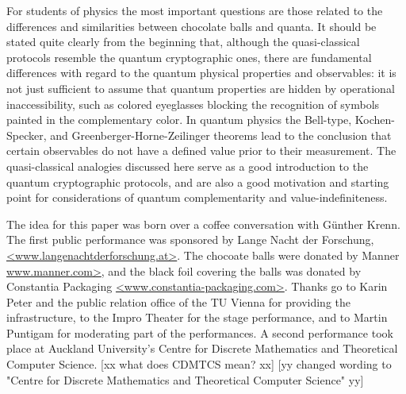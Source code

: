 \documentclass[prb,amssymb,preprint]{revtex4}
\begin{document}
For students of physics the most important questions
are those related to the differences and similarities between chocolate balls
and quanta.
It should be stated quite clearly from the beginning that,
although the quasi-classical protocols resemble the quantum cryptographic
ones, there are fundamental differences
with regard to the quantum physical properties and observables:
it is not just sufficient to assume that quantum properties are hidden
by operational inaccessibility, such as colored eyeglasses
blocking the recognition of symbols painted in the complementary color.
In quantum physics the Bell-type, Kochen-Specker,
and Greenberger-Horne-Zeilinger theorems\cite{mermin-93}
lead to the conclusion that certain observables do not
have a defined value prior to their measurement.
The quasi-classical analogies discussed here serve
as a good introduction to the quantum cryptographic protocols,
and are also a good motivation and starting point
for considerations of quantum complementarity and value-indefiniteness.

\begin{acknowledgements}
The idea for this paper was born over a coffee conversation with G\"unther
Krenn. The first public performance was sponsored by Lange Nacht der
Forschung,
\url{<www.langenachtderforschung.at>}.
The chocoate balls
were donated by Manner \url{www.manner.com>}, and the black foil covering
the balls was donated by Constantia Packaging
\url{<www.constantia-packaging.com>}.
Thanks go to Karin Peter and the public relation office of the TU Vienna for
providing the infrastructure, to the Impro Theater for the stage
performance, and to Martin Puntigam for moderating part of the performances.
A second performance took place at Auckland University's
Centre for Discrete Mathematics and Theoretical Computer Science.
[xx what does CDMTCS mean? xx]
[yy changed wording to "Centre for Discrete Mathematics and Theoretical Computer Science" yy]
\end{acknowledgements}
\end{document}
